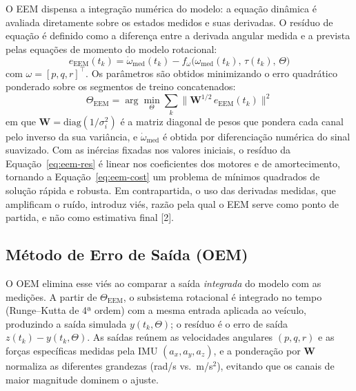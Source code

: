 \documentclass[letterpaper, 10 pt, conference]{ieeeconf}
\begin{document}
O EEM dispensa a integração numérica do modelo: a equação dinâmica é avaliada diretamente sobre os estados medidos e suas derivadas. O resíduo de equação é definido como a diferença entre a derivada angular medida e a prevista pelas equações de momento do modelo rotacional:
\begin{equation}
e_{\text{EEM}}(t_k) = \dot{\omega}_{\text{med}}(t_k) - f_\omega\big(\omega_{\text{med}}(t_k),\, \tau(t_k),\, \Theta\big)
\label{eq:eem-res}
\end{equation}
com $\omega = [p, q, r]^{\top}$. Os parâmetros são obtidos minimizando o erro quadrático ponderado sobre os segmentos de treino concatenados:
\begin{equation}
\Theta_{\text{EEM}} = \arg\min_{\Theta} \sum_{k} \big\| \mathbf{W}^{1/2}\, e_{\text{EEM}}(t_k) \big\|^2
\label{eq:eem-cost}
\end{equation}
em que $\mathbf{W} = \mathrm{diag}(1/\sigma_i^2)$ é a matriz diagonal de pesos que pondera cada canal pelo inverso da sua variância, e $\dot{\omega}_{\text{med}}$ é obtida por diferenciação numérica do sinal suavizado. Com as inércias fixadas nos valores iniciais, o resíduo da Equação~\eqref{eq:eem-res} é linear nos coeficientes dos motores e de amortecimento, tornando a Equação~\eqref{eq:eem-cost} um problema de mínimos quadrados de solução rápida e robusta. Em contrapartida, o uso das derivadas medidas, que amplificam o ruído, introduz viés, razão pela qual o EEM serve como ponto de partida, e não como estimativa final [2].

\subsection{Método de Erro de Saída (OEM)}

O OEM elimina esse viés ao comparar a saída \emph{integrada} do modelo com as medições. A partir de $\Theta_{\text{EEM}}$, o subsistema rotacional é integrado no tempo (Runge--Kutta de 4ª ordem) com a mesma entrada aplicada ao veículo, produzindo a saída simulada $y(t_k, \Theta)$; o resíduo é o erro de saída $z(t_k) - y(t_k, \Theta)$. As saídas reúnem as velocidades angulares $(p, q, r)$ e as forças específicas medidas pela IMU $(a_x, a_y, a_z)$, e a ponderação por $\mathbf{W}$ normaliza as diferentes grandezas (rad/s vs.\ m/s$^2$), evitando que os canais de maior magnitude dominem o ajuste.
\end{document}
